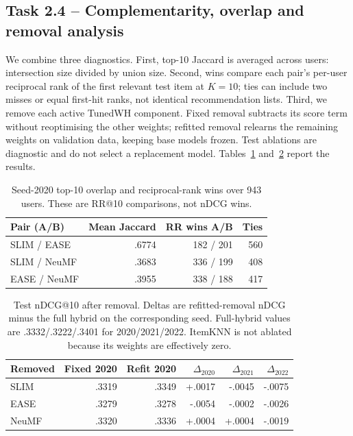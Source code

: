 \documentclass[12pt,a4paper]{article}   %
\begin{document}
\clearpage
\subsection{Task 2.4 -- Complementarity, overlap and removal analysis}

We combine three diagnostics. First, top-10 Jaccard is averaged across users: intersection size divided by union size. Second, wins compare each pair's per-user reciprocal rank of the first relevant test item at $K=10$; ties can include two misses or equal first-hit ranks, not identical recommendation lists. Third, we remove each active TunedWH component. Fixed removal subtracts its score term without reoptimising the other weights; refitted removal relearns the remaining weights on validation data, keeping base models frozen. Test ablations are diagnostic and do not select a replacement model. Tables~\ref{tab:overlap} and~\ref{tab:component-removal} report the results.

\begin{table}[H]
\centering
\begin{tabular}{lrrr}
\toprule
Pair (A/B) & Mean Jaccard & RR wins A/B & Ties \\
\midrule
SLIM / EASE & .6774 & 182 / 201 & 560 \\
SLIM / NeuMF & .3683 & 336 / 199 & 408 \\
EASE / NeuMF & .3955 & 338 / 188 & 417 \\
\bottomrule
\end{tabular}
\caption{Seed-2020 top-10 overlap and reciprocal-rank wins over 943 users. These are RR@10 comparisons, not nDCG wins.}
\label{tab:overlap}
\end{table}

\begin{table}[H]
\centering
\begin{tabular}{lrrrrr}
\toprule
Removed & Fixed 2020 & Refit 2020 & $\Delta_{2020}$ & $\Delta_{2021}$ & $\Delta_{2022}$ \\
\midrule
SLIM & .3319 & .3349 & +.0017 & -.0045 & -.0075 \\
EASE & .3279 & .3278 & -.0054 & -.0002 & -.0026 \\
NeuMF & .3320 & .3336 & +.0004 & +.0004 & -.0019 \\
\bottomrule
\end{tabular}
\caption{Test nDCG@10 after removal. Deltas are refitted-removal nDCG minus the full hybrid on the corresponding seed. Full-hybrid values are .3332/.3222/.3401 for 2020/2021/2022. ItemKNN is not ablated because its weights are effectively zero.}
\label{tab:component-removal}
\end{table}
\end{document}
